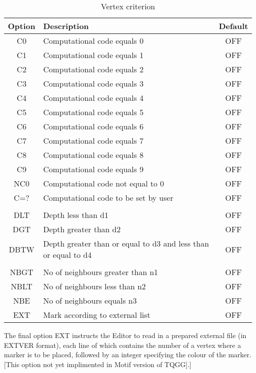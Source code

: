 \documentclass{article}
\begin{document}
\begin{table}[htb!]
 \caption{Vertex criterion}
\begin{center}
 \begin{tabular}{| c | l | c |}
	\hline
	Option & Description & Default\\
	\hline
	\hline	
	
	C0 & Computational code equals 0 & OFF\\ \hline
	C1 & Computational code equals 1 & OFF\\ \hline
	C2 & Computational code equals 2 & OFF\\ \hline
	C3 & Computational code equals 3 & OFF\\ \hline
	C4 & Computational code equals 4 & OFF\\ \hline
	C5 & Computational code equals 5 & OFF\\ \hline
	C6 & Computational code equals 6 & OFF\\ \hline
	C7 & Computational code equals 7 & OFF\\ \hline
	C8 & Computational code equals 8 & OFF\\ \hline
	C9 & Computational code equals 9 & OFF\\ \hline
	NC0 & Computational code not equal to 0 & OFF\\ \hline
	C=? & Computational code to be set by user & OFF\\ \hline
	 & & \\ \hline
	DLT & Depth less than d1 & OFF\\ \hline
	DGT & Depth greater than d2 & OFF\\ \hline
	DBTW & Depth greater than or equal to d3 and less than or equal to d4 & OFF\\ \hline
	 & & \\ \hline 
	NBGT & No of neighbours greater than n1 & OFF\\ \hline
	NBLT & No of neighbours less than n2 & OFF\\ \hline
	NBE & No of neighbours equals n3 & OFF\\ \hline
	EXT & Mark according to external list & OFF\\ \hline
 
 
 \end{tabular}
\end{center}
\end{table}




The final option EXT instructs the Editor to read in a prepared external file (in EXTVER format), each line of which contains the number of a vertex where a marker is to be placed, followed by an integer specifying the colour of the marker. [This option not yet implimented in Motif version of TQGG].]
\end{document}
